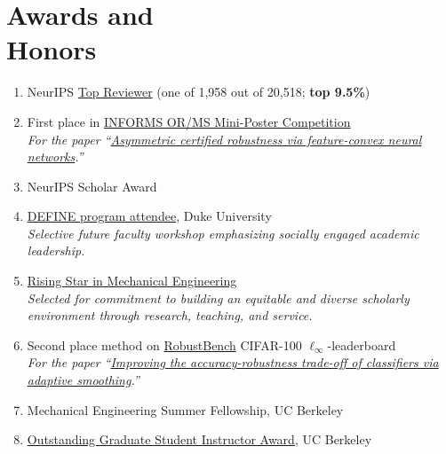 \section{\texorpdfstring{Awards and \\[\baselineskip] Honors}{Awards and Honors}}
\hfill\vspace*{-2\baselineskip}
\begin{enumerate}[label={\arabic*.}]
	\item NeurIPS \href{https://neurips.cc/Conferences/2025/ProgramCommittee#top-reviewer}{Top Reviewer} (one of 1,958 out of 20,518; \textbf{top 9.5\%})
	\item First place in \href{https://www.informs.org/Publications/OR-MS-Tomorrow/OR-MS-Tomorrow-Mini-Poster-Competition-2023-Winners}{INFORMS OR/MS Mini-Poster Competition}
	 \\
	\textit{For the paper ``\href{https://arxiv.org/pdf/2302.01961.pdf}{Asymmetric certified robustness via feature-convex neural networks}.''}
	\item NeurIPS Scholar Award
	\item \href{https://sites.google.com/view/duke-engineering-define/home}{DEFINE program attendee}, Duke University
	 \\
	\textit{Selective future faculty workshop emphasizing socially engaged academic leadership.}
	\item \href{https://me.berkeley.edu/me-rising-stars/}{Rising Star in Mechanical Engineering}
	 \\
	\textit{Selected for commitment to building an equitable and diverse scholarly environment through research, teaching, and service.}
	\item Second place method on \href{https://robustbench.github.io/#div_cifar100_Linf_heading}{RobustBench} CIFAR-100 $\ell_\infty$-leaderboard
	 \\
	\textit{For the paper ``\href{https://bai-yt.github.io/files/publications/AdaptiveSmoothing_PrePrint.pdf}{Improving the accuracy-robustness trade-off of classifiers via adaptive smoothing}.''}
	\item Mechanical Engineering Summer Fellowship, UC Berkeley
	\item \href{https://gsi.berkeley.edu/programs-services/award-programs/ogsi/ogsi-recipients-2022-2023/}{Outstanding Graduate Student Instructor Award}, UC Berkeley

\end{enumerate}

